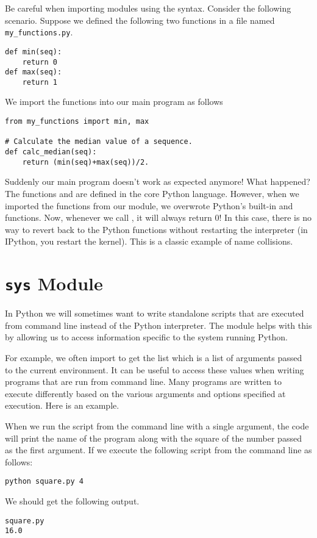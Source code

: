 \begin{warn}
Be careful when importing modules using the  syntax.
Consider the following scenario.
Suppose we defined the following two functions in a file named \texttt{my\_functions.py}.
\begin{lstlisting}
def min(seq):
    return 0
def max(seq):
    return 1
\end{lstlisting}

We import the functions into our main program as follows
\begin{lstlisting}
from my_functions import min, max

# Calculate the median value of a sequence.
def calc_median(seq):
    return (min(seq)+max(seq))/2.
\end{lstlisting}

Suddenly our main program doesn't work as expected anymore!  What happened?
The functions  and  are defined in the core Python language.
However, when we imported the functions from our module, we overwrote Python's built-in  and  functions.
Now, whenever we call , it will always return 0!
In this case, there is no way to revert back to the Python functions without restarting the interpreter (in IPython, you restart the kernel).
This is a classic example of name collisions.
\end{warn}

\section*{\texttt{sys} Module}
In Python we will sometimes want to write standalone scripts that are executed from command line instead of the Python interpreter. The  module helps with this by allowing us to access information specific to the system running Python.

For example, we often import  to get the list  which is a list of arguments passed to the current environment.
It can be useful to access these values when writing programs that are run from command line.
Many programs are written to execute differently based on the various arguments and options specified at execution.
Here is an example.


When we run the script from the command line with a single argument, the code will print the name of the program along with the square of the number passed as the first argument.
If we execute the following script from the command line as follows:
\begin{lstlisting}[style=ShellInput]
python square.py 4
\end{lstlisting}
We should get the following output.
\begin{lstlisting}[style=ShellOutput]
square.py
16.0
\end{lstlisting}

